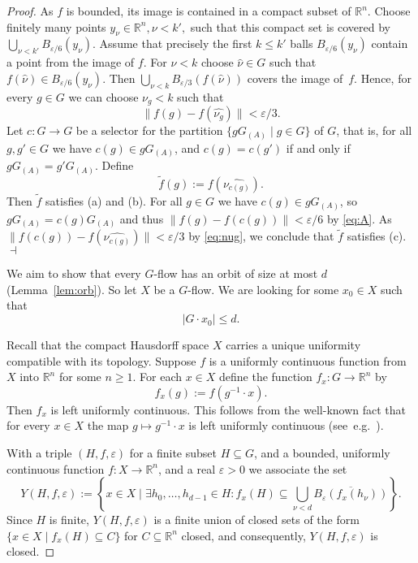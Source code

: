 \documentclass[12pt]{amsart}
\theoremstyle{plain}
\theoremstyle{definition}
\begin{document}
\begin{proof}
As $f$ is bounded, its image is contained in a compact subset of $\mathbb R^n$. Choose finitely many points
$y_\nu\in\mathbb R^n, \nu<k',$ such that this compact set is covered by $\bigcup_{\nu<k'} B_{\varepsilon/6}(y_\nu)$. 
Assume that precisely the first $k\le k'$ balls 
$B_{\varepsilon/6}(y_\nu)$ contain a point from the image of $f$. For $\nu<k$ choose $\widehat{\nu}\in G$ such 
that $f(\widehat{\nu})\in B_{\varepsilon/6}(y_\nu)$. Then 
$\bigcup_{\nu<k}B_{\varepsilon/3}(f(\widehat{\nu}))$ covers the image of~$f$. Hence, for every $g\in G$ we can choose
$\nu_g<k$ such that 
\begin{equation}\label{eq:nug}
\|f(g)-f(\widehat{\nu_g})\|<\varepsilon/3. 
\end{equation}
Let $c:G\to G$ be a selector for the partition $\{gG_{(A)}\mid g\in G\}$ of $G$, that is, for all $g,g'\in G$
 we have $c(g)\in gG_{(A)}$, and $c(g)=c(g')$ if and only if $gG_{(A)}=g'G_{(A)}$.
Define 
$$
\tilde f(g):=f(\widehat{\nu_{c(g)}}).
$$ 
Then $\tilde f$ satisfies (a) and (b). 
For all $g\in G$ we have $c(g)\in gG_{(A)}$, so $gG_{(A)}=c(g)G_{(A)}$ and thus 
$\|f(g)-f(c(g))\|<\varepsilon/6$ by \eqref{eq:A}. As
$\|f(c(g))-f(\widehat{\nu_{c(g)}})\|<\varepsilon/3$ by \eqref{eq:nug}, we conclude 
that $\tilde f$ satisfies  (c).\hfill$\dashv$\medskip

We aim to show that every $G$-flow has an orbit of size at most $d$ (Lemma~\ref{lem:orb}). So let $X$ be a $G$-flow. We are looking for some $x_0\in X$ such that
\begin{equation}\label{eq:goal}
|G\cdot x_0|\le d.
\end{equation}

Recall that the compact Hausdorff space $X$ carries a unique uniformity compatible with its topology. 
Suppose $f$ is a uniformly continuous function from $X$ into $\mathbb R^{n}$ for some $n\ge 1$. For each $x\in X$
define the function $f_x:G\to  \mathbb R^{n}$ by 
$$
f_x(g):=f(g^{-1}\cdot x).
$$ 
Then $f_x$ is left uniformly continuous. This follows from the well-known fact that
for every $x\in X$ the map $g\mapsto g^{-1}\cdot x$ is left uniformly continuous (see~e.g.~\cite[L2.1.5]{pestov}). 

With a triple $(H,f,\varepsilon)$ for a finite subset $H\subseteq G$, and a bounded, 
uniformly continuous function $f:X\to\mathbb R^{n}$, and a real $\varepsilon>0$ we associate the set
$$\textstyle
Y(H,f,\varepsilon):=\left\{x\in X\mid \exists h_0,\ldots, h_{d-1} \in H: f_x(H)\subseteq \bigcup_{\nu<d}\overline{B_{\varepsilon}(f_x(h_\nu))}\right\}.
$$
Since $H$ is finite, $Y(H,f,\varepsilon)$ is a finite union of closed sets of the form
$\{x\in X\mid f_x(H)\subseteq C\}$ for $C\subseteq \mathbb R^n$ closed, and consequently, 
$Y(H,f,\varepsilon)$ is closed.


\end{proof}
\end{document}
